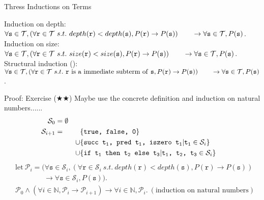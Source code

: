 \begin{frame}{Thress Inductions on Terms}
\begin{theorem}
  Induction on depth:\\
  \quad $\forall \texttt{s} \in \mathcal{T},
  (\forall \texttt{r}\in\mathcal{T} ~s.t.~ depth(\texttt{r}) < depth(\texttt{s}), P(\texttt{r}) \rightarrow P(\texttt{s}))
  \\\qquad\rightarrow \forall \texttt{s} \in \mathcal{T}, P(\texttt{s})$.\\
  Induction on size:\\
  \quad $\forall \texttt{s} \in \mathcal{T},
  (\forall \texttt{r}\in\mathcal{T} ~s.t.~ size(\texttt{r}) < size(\texttt{s}), P(\texttt{r}) \rightarrow P(\texttt{s}))
  \\\qquad\rightarrow \forall \texttt{s} \in \mathcal{T}, P(\texttt{s})$.\\
  Structural induction ():\\
  \quad $\forall \texttt{s} \in \mathcal{T},
  (\forall \texttt{r}\in\mathcal{T} ~s.t.~ \text{\texttt{r} is a immediate subterm of \texttt{s}}, P(\texttt{r}) \rightarrow P(\texttt{s}))
  \\\qquad \rightarrow \forall \texttt{s} \in \mathcal{T}, P(\texttt{s})$.\\
\end{theorem}
\end{frame}

\begin{frame}{Proof: Exercise ($\bigstar\bigstar$)}
\pause
Maybe use the concrete definition and induction on natural numbers......
\begin{alignat*}{2}
  \mathcal{S}_0 &= \emptyset \\
  \mathcal{S}_{i+1} &= & &\{ \texttt{true, false, 0} \}\\
  &&\cup &\{ \texttt{succ t\textsubscript{1}, pred t\textsubscript{1}, iszero t\textsubscript{1}} \vert \texttt{t\textsubscript{1}} \in \mathcal{S}_i \}\\
  &&\cup &\{ \texttt{if t\textsubscript{1} then t\textsubscript{2} else t\textsubscript{3}} \vert \texttt{t\textsubscript{1}, t\textsubscript{2}, t\textsubscript{3}} \in \mathcal{S}_i \}\\
\end{alignat*}
\vspace*{-3em}
\begin{align*}
  &\text{let} ~\mathcal{P}_i = (\forall \texttt{s}\in\mathcal{S}_{i},
    (\forall \texttt{r}\in\mathcal{S}_{i} ~s.t.~ depth(\texttt{r}) < depth(\texttt{s}), P(\texttt{r}) \rightarrow P(\texttt{s}))\\
  &\qquad\qquad\rightarrow \forall \texttt{s}\in\mathcal{S}_i, P(\texttt{s})).\\
  &\mathcal{P}_0 \land \left(\forall i \in \mathbb{N}, \mathcal{P}_{i} \rightarrow \mathcal{P}_{i+1}\right) \rightarrow \forall i \in \mathbb{N}, \mathcal{P}_{i}. ~(\text{induction on natural numbers})
\end{align*}
\end{frame}

